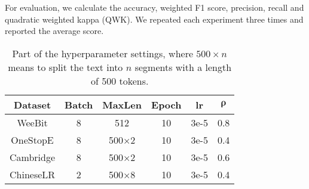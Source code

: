\documentclass[11pt]{article}
\begin{document}
For evaluation, we calculate the accuracy, weighted F1 score, precision, recall and quadratic weighted kappa (QWK). We repeated each experiment three times and reported the average score.



\begin{table}[htbp]
\centering
\small
\begin{tabular}{cccccc}
\hline
\textbf{Dataset} & \textbf{Batch} & \textbf{MaxLen} & \textbf{Epoch} & \textbf{lr} & $\bm \rho$ \\
\hline
WeeBit    & 8 & 512   & 10 & 3e-5 & 0.8 \\
OneStopE  & 8 & 500×2 & 10 & 3e-5 & 0.4 \\
Cambridge & 8 & 500×2 & 10 & 3e-5 & 0.6 \\
ChineseLR & 2 & 500×8 & 10 & 3e-5 & 0.4 \\
\hline
\end{tabular}
\caption{Part of the hyperparameter settings, where $500 \times n$ means to split the text into $n$ segments with a length of 500 tokens.}
\end{table}
\end{document}
